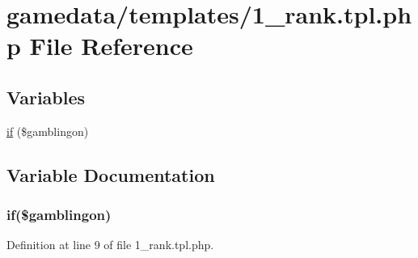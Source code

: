 \hypertarget{1__rank_8tpl_8php}{\section{gamedata/templates/1\+\_\+rank.tpl.\+php File Reference}
\label{1__rank_8tpl_8php}
}
\subsection*{Variables}
\begin{DoxyCompactItemize}
\item 
\hyperlink{1__rank_8tpl_8php_ac6168b547b75bde57d34253656bdd3df}{if} (\$gamblingon)
\end{DoxyCompactItemize}


\subsection{Variable Documentation}
\hypertarget{1__rank_8tpl_8php_ac6168b547b75bde57d34253656bdd3df}{
\subsubsection[{if}]{\setlength{\rightskip}{0pt plus 5cm}if(\$gamblingon)}}\label{1__rank_8tpl_8php_ac6168b547b75bde57d34253656bdd3df}


Definition at line 9 of file 1\+\_\+rank.\+tpl.\+php.

